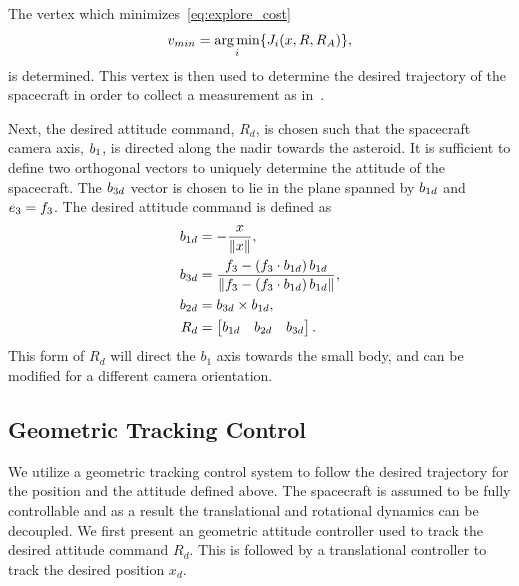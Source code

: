 \documentclass[journal]{new-aiaa}
\DeclareMathOperator*{\argmin}{arg\,min}
\begin{document}
The vertex which minimizes~\cref{eq:explore_cost} 
\begin{align*}
    \vc{v}_{min} = \argmin_{i} \{J_i(x, R, R_A)\},
\end{align*}
is determined.
This vertex is then used to determine the desired trajectory of the spacecraft in order to collect a measurement as in~.

Next, the desired attitude command, \( R_d\), is chosen such that the spacecraft camera axis, \( b_1 \), is directed along the nadir towards the asteroid.
It is sufficient to define two orthogonal vectors to uniquely determine the attitude of the spacecraft.
The \( b_{3d} \) vector is chosen to lie in the plane spanned by \(b_{1d} \) and \( e_3 = f_3 \).
The desired attitude command is defined as
\begin{align}
    b_{1d} &= - \frac{x}{\left\| x \right\|} , \\
    b_{3d} &= \frac{f_3 - \left( f_3 \cdot b_{1d} \right) b_{1d}}{\left\| f_3 - \left( f_3 \cdot b_{1d} \right) b_{1d} \right\|}, \\
    b_{2d} &= b_{3d} \times b_{1d} , \\
    R_d &= \begin{bmatrix} b_{1d} & b_{2d} & b_{3d} \end{bmatrix} .
\end{align}
This form of \( R_d \) will direct the \( b_1 \) axis towards the small body, and can be modified for a different camera orientation.

\subsection{Geometric Tracking Control}

We utilize a geometric tracking control system to follow the desired trajectory for the position and the attitude defined above. 
The spacecraft is assumed to be fully controllable and as a result the translational and rotational dynamics can be decoupled.
We first present an geometric attitude controller used to track the desired attitude command \( R_d \).
This is followed by a translational controller to track the desired position \( x_d \).
\end{document}
